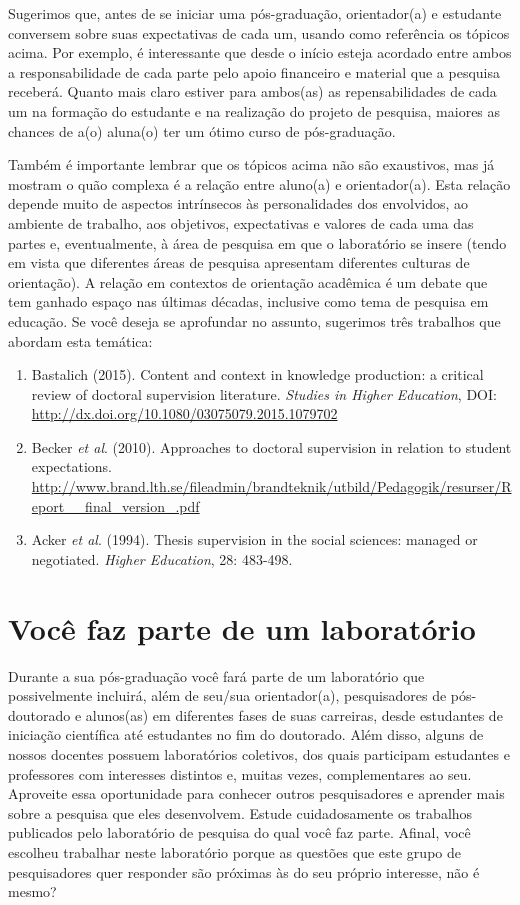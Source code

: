 \documentclass[twoside a4paper 12pt]{report}
\begin{document}
Sugerimos que, antes de se iniciar uma pós-graduação, orientador(a) e estudante conversem sobre suas expectativas de cada um, usando como referência os tópicos acima. Por exemplo, é interessante que desde o início esteja acordado entre ambos a responsabilidade de cada parte pelo apoio financeiro e material que a pesquisa receberá. Quanto mais claro estiver para ambos(as) as repensabilidades de cada um na formação do estudante e na realização do projeto de pesquisa, maiores as chances de a(o) aluna(o) ter um ótimo curso de pós-graduação.

Também é importante lembrar que os tópicos acima não são exaustivos, mas já mostram o quão complexa é a relação entre aluno(a) e orientador(a). Esta relação depende muito de aspectos intrínsecos às personalidades dos envolvidos, ao ambiente de trabalho, aos objetivos, expectativas e valores de cada uma das partes e, eventualmente, à área de pesquisa em que o laboratório se insere (tendo em vista que diferentes áreas de pesquisa apresentam diferentes culturas de orientação). A relação em contextos de orientação acadêmica é um debate que tem ganhado espaço nas últimas décadas, inclusive como tema de pesquisa em educação. Se você deseja se aprofundar no assunto, sugerimos três trabalhos que abordam esta temática:
\begin{enumerate}
\item Bastalich (2015). Content and context in knowledge production: a critical review of
doctoral supervision literature. \textit{Studies in Higher Education}, DOI: {\url{http://dx.doi.org/10.1080/03075079.2015.1079702}}
\item Becker \textit{et al}. (2010). Approaches to doctoral supervision in relation to student expectations. {\url{http://www.brand.lth.se/fileadmin/brandteknik/utbild/Pedagogik/resurser/Report__final_version_.pdf}}
\item Acker \textit{et al}. (1994). Thesis supervision in the social sciences: managed or negotiated. \textit{Higher Education}, 28: 483-498.
\end{enumerate}

\section{Você faz parte de um laboratório}

Durante a sua pós-graduação você fará parte de um laboratório que possivelmente incluirá, além de seu/sua orientador(a), pesquisadores de pós-doutorado e alunos(as) em diferentes fases de suas carreiras, desde estudantes de iniciação científica até estudantes no fim do doutorado. Além disso, alguns de nossos docentes possuem laboratórios coletivos, dos quais participam estudantes e professores com interesses distintos e, muitas vezes, complementares ao seu. Aproveite essa oportunidade para conhecer outros pesquisadores e aprender mais sobre a pesquisa que eles desenvolvem. Estude cuidadosamente os trabalhos publicados pelo laboratório de pesquisa do qual você faz parte. Afinal, você escolheu trabalhar neste laboratório porque as questões que este grupo de pesquisadores quer responder são próximas às do seu próprio interesse, não é mesmo?
\end{document}

